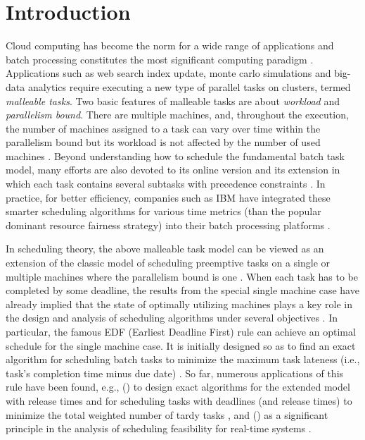 \documentclass[10pt,journal,compsoc]{IEEEtran}
\newcommand{\rmnum}[1]{\romannumeral #1}
\begin{document}
\IEEEdisplaynontitleabstractindextext




\IEEEpeerreviewmaketitle




\section{Introduction}
\label{intro}


Cloud computing has become the norm for a wide range of applications and batch processing constitutes the most significant computing paradigm \cite{Hu}. Applications such as web search index update, monte carlo simulations and big-data analytics require executing a new type of parallel tasks on clusters, termed {\em malleable tasks}. Two basic features of malleable tasks are about {\em workload} and {\em parallelism bound}. There are multiple machines, and, throughout the execution, the number of machines assigned to a task can vary over time within the parallelism bound but its workload is not affected by the number of used machines \cite{Jain11a,Jain}. Beyond understanding how to schedule the fundamental batch task model, many efforts are also devoted to its online version \cite{Lucier,Azar,Jain14} and its extension in which each task contains several subtasks with precedence constraints \cite{Bodik,Nagarajan}. In practice, for better efficiency, companies such as IBM have integrated these smarter scheduling algorithms for various time metrics  \cite{Nagarajan} (than the popular dominant resource fairness strategy) into their batch processing platforms \cite{Wolf}.


In scheduling theory, the above malleable task model can be viewed as an extension of the classic model of scheduling preemptive tasks on a single or multiple machines where the parallelism bound is one \cite{Lawler91,Karger}.  When each task has to be completed by some deadline, the results from the special single machine case have already implied that the state of optimally utilizing machines plays a key role in the design and analysis of scheduling algorithms under several objectives \cite{Karger}. In particular, the famous EDF (Earliest Deadline First) rule can achieve an optimal schedule for the single machine case. It is initially designed so as to find an exact algorithm for scheduling batch tasks to minimize the maximum task lateness (i.e., task's completion time minus due date) \cite{Jac55}. So far, numerous applications of this rule have been found, e.g., (\rmnum{1}) to design exact algorithms for the extended model with release times \cite{Hor74} and for scheduling tasks with deadlines (and release times) to minimize the total weighted number of tardy tasks \cite{Lawler69}, and (\rmnum{2}) as a significant principle in the analysis of scheduling feasibility for real-time systems \cite{Stankovic98}.
\end{document}
